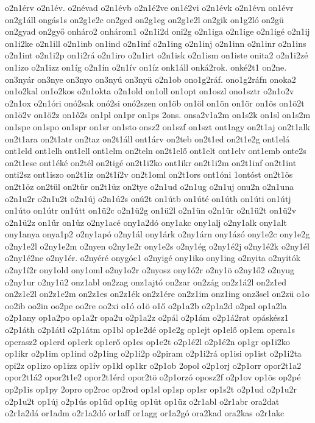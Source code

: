 {o2n1érv
o2n1év.
o2névad
o2n1évb
o2n1é2ve
on1é2vi
o2n1évk
o2n1évn
on1évr
on2g1áll
ongás1s
on2g1e2c
on2ged
on2g1eg
on2g1e2l
on2gik
on1g2ló
on2gü
on2gyad
on2győ
onháro2
onhárom1
o2n1i2d
oni2g
o2n1iga
o2n1ige
o2n1igé
o2n1ij
on1i2ke
o2n1ill
o2n1inb
on1ind
o2n1inf
o2n1ing
o2n1inj
o2n1inn
o2n1inr
o2n1ins
o2n1int
o2n1i2p
on1i2rá
o2n1iro
o2n1irt
o2n1isk
o2n1ism
on1iste
onita2
o2n1i2zé
on1izo
o2n1izz
on1íg
o2n1ín
o2n1ív
on1íz
onk1áll
onká2rok.
onké2t1
on2ne.
on3nyár
on3nye
on3nyo
on3nyú
on3nyü
o2n1ob
ono1g2ráf.
ono1g2ráfn
onoka2
on1o2kal
on1o2kos
o2n1okta
o2n1old
on1oll
on1opt
on1oszl
ono1sztr
o2n1o2v
o2n1ox
o2n1óri
onó2sak
onó2si
onó2szen
on1öb
on1öl
on1ön
on1ör
on1ös
on1ö2t
on1ö2v
on1ö2z
on1ő2s
on1pl
on1pr
on1ps
2ons.
onsa2v1a2m
on1s2k
on1sl
on1s2m
on1spe
on1spo
on1spr
on1sr
on1sto
onsz2
on1szf
on1szt
ont1agy
on2t1aj
on2t1alk
on2t1ara
on2t1atr
on2taz
on2t1áll
ont1árv
on2teb
on2t1ed
on2t1e2g
ont1elá
ont1eld
ont1elh
ont1ell
ont1elm
on2teln
on2t1elő
ont1elt
ont1elv
ont1emb
onte2s
on2t1ese
ont1éké
on2tél
on2tigé
on2t1i2ko
ont1ikr
on2t1i2m
on2t1inf
on2t1int
onti2sz
ont1iszo
on2t1iz
on2t1í2v
on2t1oml
on2t1ors
ont1óni
1ontóst
on2t1ös
on2t1öz
on2tül
on2tür
on2t1üz
on2tye
o2n1ud
o2n1ug
o2n1uj
onu2n
o2n1una
o2n1u2r
o2n1u2t
o2n1új
o2n1ú2s
onú2t
on1útb
on1úté
on1úth
on1úti
on1útj
on1úto
on1útr
on1útt
on1ü2c
o2n1ü2g
on1ü2l
o2n1ün
o2n1ür
o2n1ü2t
on1ü2v
o2n1ü2z
on1űr
on1űz
o2ny1acé
ony1a2dó
ony1akc
ony1alj
o2ny1alk
ony1alt
ony1anya
onya1p2
o2ny1apó
o2ny1ál
ony1árk
o2ny1árn
ony1ázó
ony1e2c
ony1e2g
o2ny1e2l
o2ny1e2m
o2nyen
o2ny1e2r
ony1e2s
o2ny1ég
o2ny1é2j
o2ny1é2k
o2ny1él
o2ny1é2ne
o2ny1ér.
o2nyéré
onygóc1
o2nyigé
ony1iko
ony1ing
o2nyita
o2nyitók
o2ny1í2r
ony1old
ony1oml
o2ny1o2r
o2nyosz
ony1ó2r
o2ny1ö
o2ny1ő2
o2nyug
o2ny1ur
o2ny1ü2
onz1abl
on2zag
onz1ajtó
on2zar
on2zág
on2z1á2l
on2z1ed
on2z1e2l
on2z1e2m
on2z1es
on2z1ék
on2z1ére
on2z1im
onz1ing
onz3sel
on2zü
o1o
oo2ib
oo2in
oo2pe
oo2re
oo2xi
o1ó
o1ö
o1ő
o2p1a2b
o2p1a2d
o2pal
op1a2la
o2p1any
op1a2po
op1a2r
opa2u
o2p1a2z
o2pál
o2p1ám
o2p1á2rat
opáskész1
o2p1áth
o2p1átl
o2p1átm
op1bl
op1e2dé
op1e2g
op1ejt
op1elő
op1em
opera1s
operasz2
op1erd
op1erk
op1erő
op1es
op1e2t
o2p1é2l
o2p1é2n
op1gr
op1i2ko
op1ikr
o2p1im
op1ind
o2p1ing
o2p1i2p
o2piram
o2p1i2rá
op1isi
op1ist
o2p1i2ta
opi2z
op1izo
op1izz
op1ív
op1kl
op1kr
o2p1ob
2opol
o2p1orj
o2p1orr
opor2t1a2
opor2t1á2
opor2t1e2
opor2t1érd
opor2tö
o2p1orzó
oposz2f
o2p1ov
op1ös
op2pé
op2p1is
op1py
2opro
op2roc
op2rod
op1sl
op1sp
op1sr
op1s2t
o2p1ud
o2p1u2r
o2p1u2t
op1új
o2p1ús
op1üd
op1üg
op1üt
op1üz
o2r1abl
o2r1abr
ora2dat
o2r1a2dá
or1adm
o2r1a2dó
or1aff
or1agg
or1a2gó
ora2kad
ora2kas
o2r1akc
}

